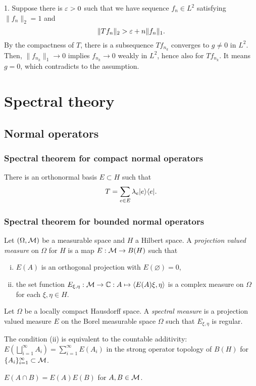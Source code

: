 \documentclass{../../large}
\begin{document}
\begin{pf}
1. Suppose there is $\varepsilon>0$ such that we have sequence $f_n\in L^2$ satisfying $\|f_n\|_2=1$ and
\[\|Tf_n\|_2>\varepsilon+n\|f_n\|_1.\]
By the compactness of $T$, there is a subsequence $Tf_{n_k}$ converges to $g\ne0$ in $L^2$.
Then, $\|f_{n_k}\|_1\to0$ implies $f_{n_k}\to0$ weakly in $L^2$, hence also for $Tf_{n_k}$.
It means $g=0$, which contradicts to the assumption.
\end{pf}







\part{Spectral theory}


\chapter{Normal operators}
\section{Spectral theorem for compact normal operators}
There is an orthonormal basis $E\subset H$ such that
\[T=\sum_{e\in E}\lambda_e|e\rangle\langle e|.\]

\section{Spectral theorem for bounded normal operators}

\begin{prb}
Let $(\Omega,\mathcal{M})$ be a measurable space and $H$ a Hilbert space.
A \emph{projection valued measure} on $\Omega$ for $H$ is a map $E:\mathcal{M}\to B(H)$ such that
\begin{enumerate}[(i)]
\item $E(A)$ is an orthogonal projection with $E(\varnothing)=0$,\item the set function $E_{\xi,\eta}:\mathcal{M}\to\mathbb{C}:A\mapsto\langle E(A)\xi,\eta\rangle$ is a complex measure on $\Omega$ for each $\xi,\eta\in H$.
\end{enumerate}
Let $\Omega$ be a locally compact Hausdorff space.
A \emph{spectral measure} is a projection valued measure $E$ on the Borel measurable space $\Omega$ such that $E_{\xi,\eta}$ is regular.
\begin{parts}
\item The condition (ii) is equivalent to the countable additivity: $E(\bigsqcup_{i=1}^\infty A_i)=\sum_{i=1}^\infty E(A_i)$ in the strong operator topology of $B(H)$ for $\{A_i\}_{i=1}^\infty\subset\mathcal{M}$.
\item $E(A\cap B)=E(A)E(B)$ for $A,B\in\mathcal{M}$.
\end{parts}
\end{prb}
\end{document}
